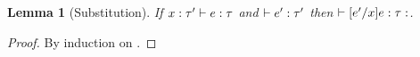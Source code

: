 \documentclass{article}
\DeclareMathOperator{\expand}{\text{\normalfont expand}}
\newtheorem{Lemma}[Theorem]{Lemma}
\begin{document}



\resetpfcounter
\begin{Lemma}[Substitution]
  \label{thm:preservation}
  If \usepfcounter[x types e] $\hastype[x : \tau']{e}{\tau}$
  and \usepfcounter[e' types] $\hastype{e'}{\tau'}$
  then \usepfcounter[e+e' types] $\hastype{\subst{e'}{x}{e} : \tau}$.
\end{Lemma}

\begin{proof}
  By induction on .
\end{proof}







% 
% 
\end{document}
